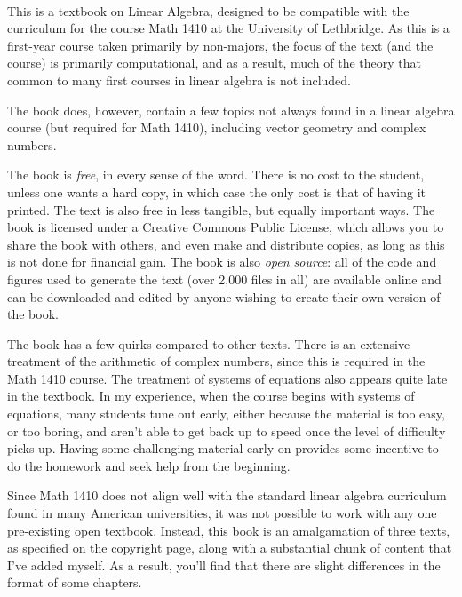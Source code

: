 \thispagestyle{empty}
\Huge
{}\\
\normalsize

This is a textbook on Linear Algebra, designed to be compatible with the curriculum for the course Math 1410 at the University of Lethbridge. As this is a first-year course taken primarily by non-majors, the focus of the text (and the course) is primarily computational, and as a result, much of the theory that common to many first courses in linear algebra is not included.

The book does, however, contain a few topics not always found in a linear algebra course (but required for Math 1410), including vector geometry and complex numbers.

The book is \textit{free}, in every sense of the word. There is no cost to the student, unless one wants a hard copy, in which case the only cost is that of having it printed. The text is also free in less tangible, but equally important ways. The book is licensed under a Creative Commons Public License, which allows you to share the book with others, and even make and distribute copies, as long as this is not done for financial gain. The book is also \textit{open source}: all of the code and figures used to generate the text (over 2,000 files in all) are available online and can be downloaded and edited by anyone wishing to create their own version of the book.

The book has a few quirks compared to other texts. There is an extensive treatment of the arithmetic of complex numbers, since this is required in the Math 1410 course. The treatment of systems of equations also appears quite late in the textbook. In my experience, when the course begins with systems of equations, many students tune out early, either because the material is too easy, or too boring, and aren't able to get back up to speed once the level of difficulty picks up. Having some challenging material early on provides some incentive to do the homework and seek help from the beginning.

Since Math 1410 does not align well with the standard linear algebra curriculum found in many American universities, it was not possible to work with any one pre-existing open textbook. Instead, this book is an amalgamation of three texts, as specified on the copyright page, along with a substantial chunk of content that I've added myself. As a result, you'll find that there are slight differences in the format of some chapters.

